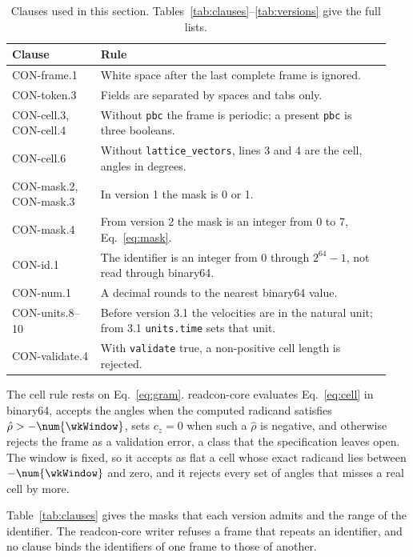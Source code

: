 \begin{table}[tbp] \centering \footnotesize
\setlength{\tabcolsep}{4pt}
\caption{Clauses used in this section.
Tables~\ref{tab:clauses}--\ref{tab:versions} give the full lists.}
\label{tab:clauses-brief}
\begin{tabular}{@{}p{0.22\linewidth}p{0.72\linewidth}@{}}
\toprule
Clause & Rule \\
\midrule
CON-frame.1 & White space after the last complete frame is ignored. \\
CON-token.3 & Fields are separated by spaces and tabs only. \\
CON-cell.3, CON-cell.4 & Without \texttt{pbc} the frame is periodic; a present \texttt{pbc} is three booleans. \\
CON-cell.6 & Without \texttt{lattice\_vectors}, lines 3 and 4 are the cell, angles in degrees. \\
CON-mask.2, CON-mask.3 & In version 1 the mask is 0 or 1. \\
CON-mask.4 & From version 2 the mask is an integer from 0 to 7, Eq.~\eqref{eq:mask}. \\
CON-id.1 & The identifier is an integer from 0 through \(2^{64}-1\), not read through binary64. \\
CON-num.1 & A decimal rounds to the nearest binary64 value. \\
CON-units.8--10 & Before version 3.1 the velocities are in the natural unit; from 3.1 \texttt{units.time} sets that unit. \\
CON-validate.4 & With \texttt{validate} true, a non-positive cell length is rejected. \\
\bottomrule
\end{tabular}
\end{table}


The cell rule rests on Eq.~\eqref{eq:gram}.
readcon-core evaluates Eq.~\eqref{eq:cell} in binary64, accepts the
angles when the computed radicand satisfies
\(\hat\rho>-\num{\wkWindow}\), sets \(c_z=0\) when such a \(\hat\rho\)
is negative, and otherwise rejects the frame as a validation error, a
class that the specification leaves open.
The window is fixed, so it accepts as flat a cell whose exact radicand
lies between \(-\num{\wkWindow}\) and zero, and it rejects every set of
angles that misses a real cell by more.

Table~\ref{tab:clauses} gives the masks that each version admits and the
range of the identifier.
The readcon-core writer refuses a frame that repeats an identifier, and
no clause binds the identifiers of one frame to those of another.

